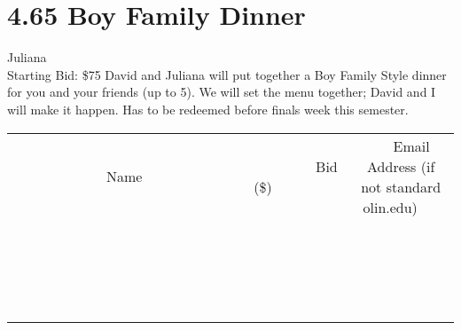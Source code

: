 \documentclass[11pt]{article}
\begin{document}
\section*{4.65 Boy Family Dinner}
Juliana
\\
Starting Bid: \$75
\newline
David and Juliana will put together a Boy Family Style dinner for you and your friends (up to 5). We will set the menu together; David and I will make it happen. Has to be redeemed before finals week this semester.
\\[3ex]
\begin{tabular}{c c c}
~~~~~~~~~~~~~Name~~~~~~~~~~~~~ & ~~~~~~~~~Bid (\$)~~~~~~~~~  & ~~~Email Address (if not standard olin.edu)~~~\\
 & & \\
\hline
 & & \\
\hline
 & & \\
\hline
 & & \\
\hline
 & & \\
\hline
 & & \\
\hline
 & & \\
\hline
 & & \\
\hline
 & & \\
\hline
 & & \\
\hline
 & & \\
\hline
 & & \\
\hline
 & & \\
\hline
 & & \\
\hline
 & & \\
\hline
 & & \\
\hline
 & & \\
\hline
 & & \\
\hline
 & & \\
\hline
\end{tabular}
\newpage
\end{document}
